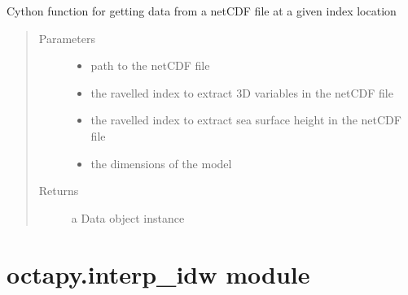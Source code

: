 \documentclass[letterpaper,10pt,english]{sphinxmanual}
\begin{document}
\begin{fulllineitems}
\label{\detokenize{octapy:octapy.get_data_at_index.get_data_at_index}}
\sphinxAtStartPar
Cython function for getting  data from a netCDF file at a given index
location
\begin{quote}\begin{description}
\item[{Parameters}] \leavevmode\begin{itemize}
\item {} 
\sphinxAtStartPar
{} \textendash{} path to the netCDF file

\item {} 
\sphinxAtStartPar
{} \textendash{} the ravelled index to extract 3D variables in the netCDF file

\item {} 
\sphinxAtStartPar
{} \textendash{} the ravelled index to extract sea surface height in the netCDF file

\item {} 
\sphinxAtStartPar
{} \textendash{} the dimensions of the model

\end{itemize}

\item[{Returns}] \leavevmode
\sphinxAtStartPar
a Data object instance

\end{description}\end{quote}

\end{fulllineitems}



\chapter{octapy.interp\_idw module}
\label{\detokenize{octapy:module-octapy.interp_idw}}\label{\detokenize{octapy:octapy-interp-idw-module}}
\end{document}
